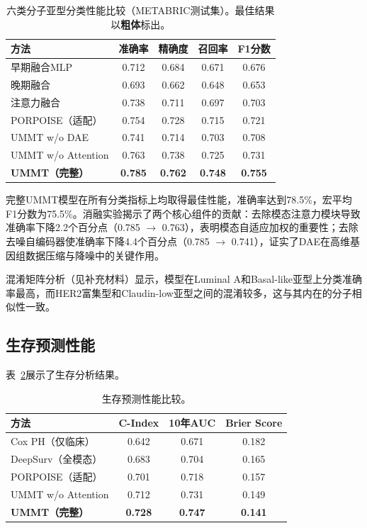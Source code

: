 \documentclass[conference]{IEEEtran}
\begin{document}
\begin{table}[htbp]
\centering
\caption{六类分子亚型分类性能比较（METABRIC测试集）。最佳结果以\textbf{粗体}标出。}
\label{tab:classification}
\small
\begin{tabular}{@{}lcccc@{}}
\toprule
\textbf{方法} & \textbf{准确率} & \textbf{精确度} & \textbf{召回率} & \textbf{F1分数} \\
\midrule
早期融合MLP & 0.712 & 0.684 & 0.671 & 0.676 \\
晚期融合 & 0.693 & 0.662 & 0.648 & 0.653 \\
注意力融合 & 0.738 & 0.711 & 0.697 & 0.703 \\
PORPOISE（适配） & 0.754 & 0.728 & 0.715 & 0.721 \\
\midrule
UMMT w/o DAE & 0.741 & 0.714 & 0.703 & 0.708 \\
UMMT w/o Attention & 0.763 & 0.738 & 0.725 & 0.731 \\
\midrule
\textbf{UMMT（完整）} & \textbf{0.785} & \textbf{0.762} & \textbf{0.748} & \textbf{0.755} \\
\bottomrule
\end{tabular}
\end{table}

完整UMMT模型在所有分类指标上均取得最佳性能，准确率达到78.5\%，宏平均F1分数为75.5\%。消融实验揭示了两个核心组件的贡献：去除模态注意力模块导致准确率下降2.2个百分点（0.785 $\to$ 0.763），表明模态自适应加权的重要性；去除去噪自编码器使准确率下降4.4个百分点（0.785 $\to$ 0.741），证实了DAE在高维基因组数据压缩与降噪中的关键作用。

混淆矩阵分析（见补充材料）显示，模型在Luminal A和Basal-like亚型上分类准确率最高，而HER2富集型和Claudin-low亚型之间的混淆较多，这与其内在的分子相似性一致。

\subsection{生存预测性能}

表~\ref{tab:survival}展示了生存分析结果。

\begin{table}[htbp]
\centering
\caption{生存预测性能比较。}
\label{tab:survival}
\small
\begin{tabular}{@{}lccc@{}}
\toprule
\textbf{方法} & \textbf{C-Index} & \textbf{10年AUC} & \textbf{Brier Score} \\
\midrule
Cox PH（仅临床） & 0.642 & 0.671 & 0.182 \\
DeepSurv（全模态） & 0.683 & 0.704 & 0.165 \\
PORPOISE（适配） & 0.701 & 0.718 & 0.157 \\
\midrule
UMMT w/o Attention & 0.712 & 0.731 & 0.149 \\
\textbf{UMMT（完整）} & \textbf{0.728} & \textbf{0.747} & \textbf{0.141} \\
\bottomrule
\end{tabular}
\end{table}
\end{document}

